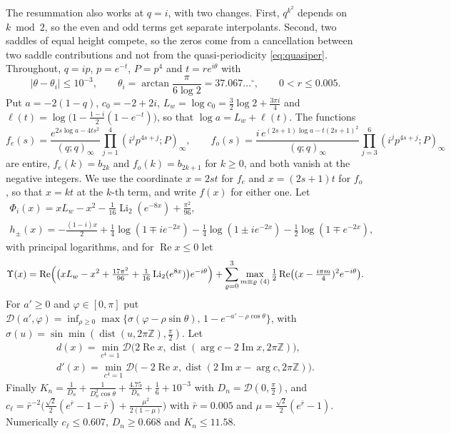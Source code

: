 \documentclass[11pt]{article}
\theoremstyle{plain}
\theoremstyle{definition}
\theoremstyle{remark}
\newcommand{\Z}{\mathbb{Z}}
\theoremstyle{plain}\newtheorem*{maintheorem}{Main Theorem}
\begin{document}
The resummation also works at $q=i$, with two changes. First, $q^{k^2}$ depends on $k\bmod 2$, so
the even and odd terms get separate interpolants. Second, two saddles of equal height compete, so
the zeros come from a cancellation between two saddle contributions and not from the
quasi-periodicity \eqref{eq:quasiper}. Throughout, $q=ip$, $p=e^{-t}$, $P=p^4$ and $t=re^{i\theta}$ with
\[
   |\theta-\theta_i|\le10^{-3},\qquad \theta_i=\arctan\frac{\pi}{6\log2}=37.067\ldots^\circ,\qquad 0<r\le0.005 .
\]
Put $a=-2(1-q)$, $c_0=-2+2i$, $L_w=\log c_0=\frac32\log2+\frac{3\pi i}4$ and
$\ell(t)=\log\bigl(1-\frac{1-i}2(1-e^{-t})\bigr)$, so that $\log a=L_w+\ell(t)$. The functions
\[
 f_e(s)=\frac{e^{2s\log a-4ts^2}}{(q;q)_\infty}\prod_{j=1}^{4}(i^jp^{4s+j};P)_\infty,\qquad
 f_o(s)=\frac{i\,e^{(2s+1)\log a-t(2s+1)^2}}{(q;q)_\infty}\prod_{j=3}^{6}(i^jp^{4s+j};P)_\infty
\]
are entire, $f_e(k)=b_{2k}$ and $f_o(k)=b_{2k+1}$ for $k\ge0$, and both vanish at the negative
integers. We use the coordinate $x=2st$ for $f_e$ and $x=(2s+1)t$ for $f_o$, so that $x=kt$ at the
$k$-th term, and write $f(x)$ for either one. Let
\begin{gather*}
 \Phi_i(x)=xL_w-x^2-\tfrac1{16}\operatorname{Li}_2(e^{-8x})+\tfrac{\pi^2}{96},\\
 h_\pm(x)=-\tfrac{(1-i)x}2+\tfrac14\log(1\mp ie^{-2x})-\tfrac14\log(1\pm ie^{-2x})-\tfrac12\log(1\mp e^{-2x}),
\end{gather*}
with principal logarithms, and for $\operatorname{Re}x\le0$ let
\[
 \Upsilon(x)=\operatorname{Re}\Bigl(\bigl(xL_w-x^2+\tfrac{17\pi^2}{96}+\tfrac1{16}\operatorname{Li}_2(e^{8x})\bigr)e^{-i\theta}\Bigr)
  +\sum_{\varrho=0}^{3}\max_{m\equiv\varrho\ (4)}\tfrac12\operatorname{Re}\bigl((x-\tfrac{i\pi m}4)^2e^{-i\theta}\bigr).
\]
For $a'\ge0$ and $\varphi\in[0,\pi]$ put
$\mathcal D(a',\varphi)=\inf_{\rho\ge0}\max\{\sigma(\varphi-\rho\sin\theta),\,1-e^{-a'-\rho\cos\theta}\}$, with
$\sigma(u)=\sin\min(\operatorname{dist}(u,2\pi\Z),\frac\pi2)$. Let
\begin{gather*}
 d(x)=\min_{c^4=1}\mathcal D\bigl(2\operatorname{Re}x,\operatorname{dist}(\arg c-2\operatorname{Im}x,2\pi\Z)\bigr),\\
 d'(x)=\min_{c^4=1}\mathcal D\bigl(-2\operatorname{Re}x,\operatorname{dist}(2\operatorname{Im}x-\arg c,2\pi\Z)\bigr).
\end{gather*}
Finally $K_n=\frac1{D_n}+\frac1{D_n^2\cos\theta}+\frac{4.75}{D_n}+\frac16+10^{-3}$ with
$D_n=\mathcal D(0,\frac\pi2)$, and $c_\ell=\bar r^{-2}\bigl(\frac{\sqrt2}2(e^{\bar r}-1-\bar r)+\frac{\mu^2}{2(1-\mu)}\bigr)$
with $\bar r=0.005$ and $\mu=\frac{\sqrt2}2(e^{\bar r}-1)$. Numerically $c_\ell\le0.607$,
$D_n\ge0.668$ and $K_n\le11.58$.
\end{document}
